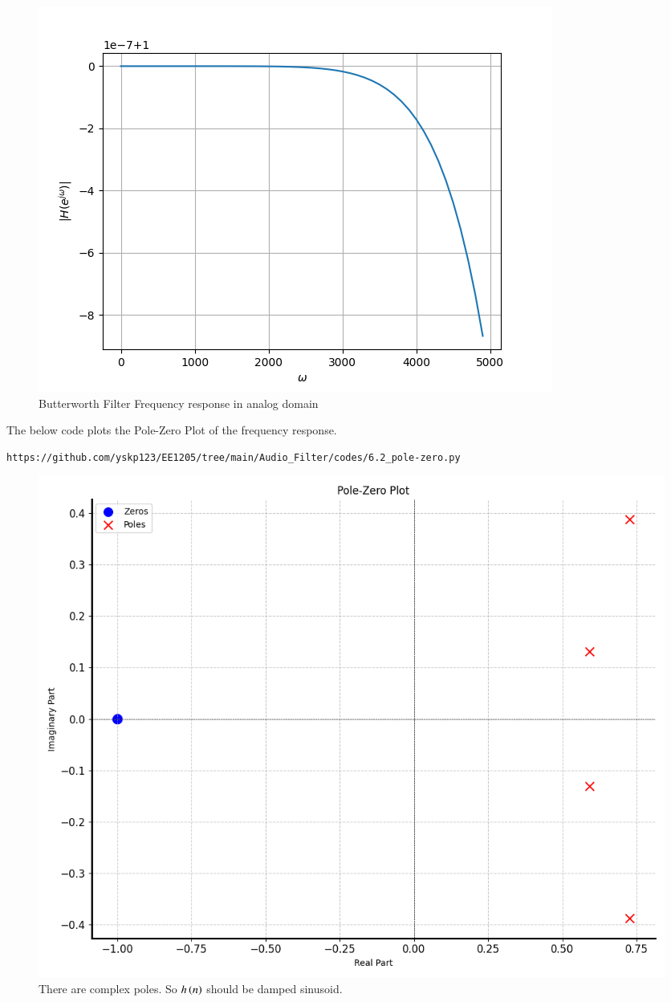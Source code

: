 \documentclass[journal,12pt,twocolumn]{IEEEtran}
\theoremstyle{remark}
\begin{document}
\begin{enumerate}[label=\thesection.\arabic*]
\begin{figure}[H]
\includegraphics[width=1\columnwidth]{figs/Butterworth_analog.png}
\caption{Butterworth Filter Frequency response in analog domain}
\label{fig:H(w)_6_bilinear}
\end{figure}



The below code plots the Pole-Zero Plot of the frequency response.
\begin{lstlisting}
https://github.com/yskp123/EE1205/tree/main/Audio_Filter/codes/6.2_pole-zero.py
\end{lstlisting}
\begin{figure}[H]
\centering
\includegraphics[width=1\columnwidth]{figs/Pole_Zero_Plt.png}
\caption{There are complex poles. So $h\left(n\right)$ should be damped sinusoid.}
\label{fig:pole_zero_6.2}
\end{figure}


\end{enumerate}
\end{document}
